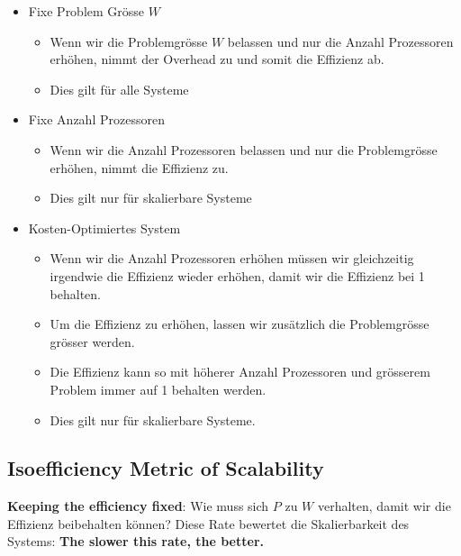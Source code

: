 \begin{itemize}
\tightlist
\item
  Fixe Problem Grösse $W$

  \begin{itemize}
  \tightlist
  \item
    Wenn wir die Problemgrösse $W$ belassen und nur die Anzahl Prozessoren
    erhöhen, nimmt der Overhead zu und somit die Effizienz ab.
  \item
    Dies gilt für alle Systeme
  \end{itemize}
\item
  Fixe Anzahl Prozessoren

  \begin{itemize}
  \tightlist
  \item
    Wenn wir die Anzahl Prozessoren belassen und nur die Problemgrösse
    erhöhen, nimmt die Effizienz zu.
  \item
    Dies gilt nur für skalierbare Systeme
  \end{itemize}
\item
  Kosten-Optimiertes System

  \begin{itemize}
  \tightlist
  \item
    Wenn wir die Anzahl Prozessoren erhöhen müssen wir gleichzeitig
    irgendwie die Effizienz wieder erhöhen, damit wir die Effizienz bei
    1 behalten.
  \item
    Um die Effizienz zu erhöhen, lassen wir zusätzlich die Problemgrösse
    grösser werden.
  \item
    Die Effizienz kann so mit höherer Anzahl Prozessoren und grösserem
    Problem immer auf 1 behalten werden.
  \item
    Dies gilt nur für skalierbare Systeme.
  \end{itemize}
\end{itemize}

\hypertarget{isoefficiency-metric-of-scalability}{%
\subsection{Isoefficiency Metric of
Scalability}\label{isoefficiency-metric-of-scalability}}

\textbf{Keeping the efficiency fixed}: Wie muss sich $P$ zu $W$ verhalten,
damit wir die Effizienz beibehalten können? Diese Rate bewertet die
Skalierbarkeit des Systems: \textbf{The slower this rate, the better.} \\

